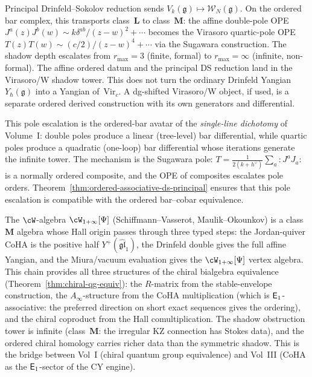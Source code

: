 \begin{remark}%
\label{rem:pole-escalation}%
%
%
Principal Drinfeld--Sokolov reduction sends
$V_k(\mathfrak{g}) \mapsto \mathcal{W}_N(\mathfrak{g})$.
On the ordered bar complex, this transports class~$\mathbf{L}$
to class~$\mathbf{M}$: the affine double-pole OPE
$J^a(z)J^b(w) \sim k\delta^{ab}/(z{-}w)^2 + \cdots$
becomes the Virasoro quartic-pole OPE
$T(z)T(w) \sim (c/2)/(z{-}w)^4 + \cdots$ via the Sugawara
construction. The shadow depth escalates from $r_{\max} = 3$
(finite, formal) to $r_{\max} = \infty$ (infinite, non-formal).
The affine ordered datum and the principal DS reduction land in the
Virasoro/W shadow tower. This does not turn the ordinary Drinfeld
Yangian $Y_\hbar(\mathfrak g)$ into a Yangian of~$\mathrm{Vir}_c$.
A dg-shifted Virasoro/W object, if used, is a separate ordered
derived construction with its own generators and differential.

This pole escalation is the ordered-bar avatar of the
\emph{single-line dichotomy} of Volume~I: double poles
produce a linear (tree-level) bar differential, while
quartic poles produce a quadratic (one-loop) bar differential
whose iterations generate the infinite tower.
The mechanism is the Sugawara pole:
$T = \tfrac{1}{2(k+h^\vee)} \sum_a {:}J^a J_a{:}$
is a normally ordered composite, and the OPE of composites
escalates pole orders. Theorem~\ref{thm:ordered-associative-ds-principal}
ensures that this pole escalation is compatible with
the ordered bar--cobar equivalence.
\end{remark}

\begin{remark}
\label{rem:w-infty-chiral-qg}
The $\cW$-algebra $\cW_{1+\infty}[\Psi]$
(Schiffmann--Vasserot, Maulik--Okounkov) is a class~$\mathbf{M}$
algebra whose Hall origin passes through three typed steps: the
Jordan-quiver CoHA is the positive half
\(Y^+(\widehat{\mathfrak{gl}}_1)\), the Drinfeld double gives the full
affine Yangian, and the Miura/vacuum evaluation gives the
\(\cW_{1+\infty}[\Psi]\) vertex algebra. This chain provides all three
structures of the chiral bialgebra equivalence
(Theorem~\ref{thm:chiral-qg-equiv}): the $R$-matrix from the
stable-envelope construction, the $A_\infty$-structure from the
CoHA multiplication (which is $\mathsf{E}_1$-associative: the preferred
direction on short exact sequences gives the ordering), and the
chiral coproduct from the Hall comultiplication. The shadow
obstruction tower is infinite (class~$\mathbf{M}$: the irregular
KZ connection has Stokes data), and the ordered chiral homology
carries richer data than the symmetric shadow.
This is the bridge between Vol~I (chiral quantum group
equivalence) and Vol~III (CoHA as the $\mathsf{E}_1$-sector of the
CY engine).
\end{remark}

